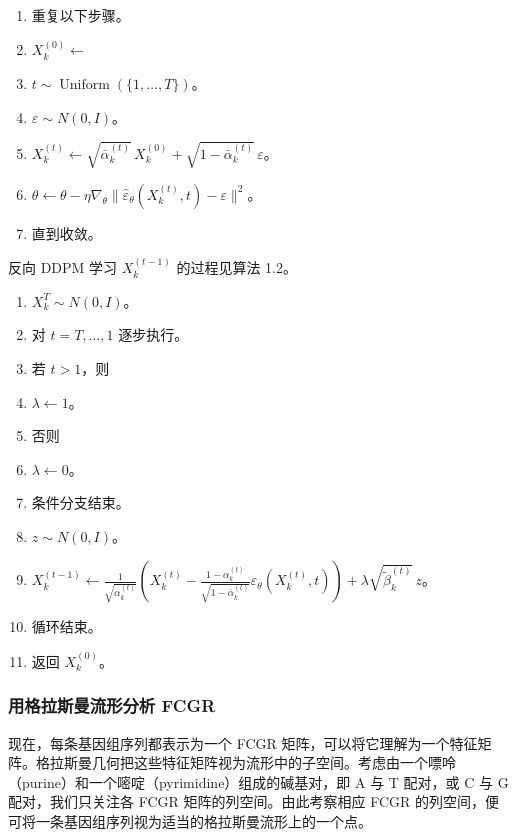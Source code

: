 \begin{enumerate}
  \item 重复以下步骤。
  \item $X_k^{(0)}\leftarrow$
  \item $t\sim\operatorname{Uniform}(\{1,\ldots,T\})$。
  \item $\varepsilon\sim N(0,I)$。
  \item $X_k^{(t)}\leftarrow
    \sqrt{\bar\alpha_k^{(t)}}\,X_k^{(0)}+\sqrt{1-\bar\alpha_k^{(t)}}\,\varepsilon$。
  \item $\theta\leftarrow\theta-\eta\nabla_\theta
    \lVert\hat\varepsilon_\theta(X_k^{(t)},t)-\varepsilon\rVert^2$。
  \item 直到收敛。
\end{enumerate}

反向 DDPM 学习 $X_k^{(t-1)}$ 的过程见算法 1.2。

\begin{enumerate}
  \item $X_k^T\sim N(0,I)$。
  \item 对 $t=T,\ldots,1$ 逐步执行。
  \item 若 $t>1$，则
  \item $\lambda\leftarrow1$。
  \item 否则
  \item $\lambda\leftarrow0$。
  \item 条件分支结束。
  \item $z\sim N(0,I)$。
  \item \(\displaystyle
    X_k^{(t-1)}\leftarrow
      \frac{1}{\sqrt{\alpha_k^{(t)}}}
      \left(
        X_k^{(t)}
        -\frac{1-\alpha_k^{(t)}}{\sqrt{1-\bar\alpha_k^{(t)}}}
          \varepsilon_\theta(X_k^{(t)},t)
      \right)
      +\lambda\sqrt{\tilde\beta_k^{(t)}}\,z
    \)。
  \item 循环结束。
  \item 返回 $X_k^{(0)}$。
\end{enumerate}

\subsubsection{用格拉斯曼流形分析 FCGR}
现在，每条基因组序列都表示为一个 FCGR 矩阵，可以将它理解为一个特征矩阵。格拉斯曼几何把这些特征矩阵视为流形中的子空间。考虑由一个嘌呤（purine）和一个嘧啶（pyrimidine）组成的碱基对，即 A 与 T 配对，或 C 与 G 配对，我们只关注各 FCGR 矩阵的列空间。由此考察相应 FCGR 的列空间，便可将一条基因组序列视为适当的格拉斯曼流形上的一个点。

